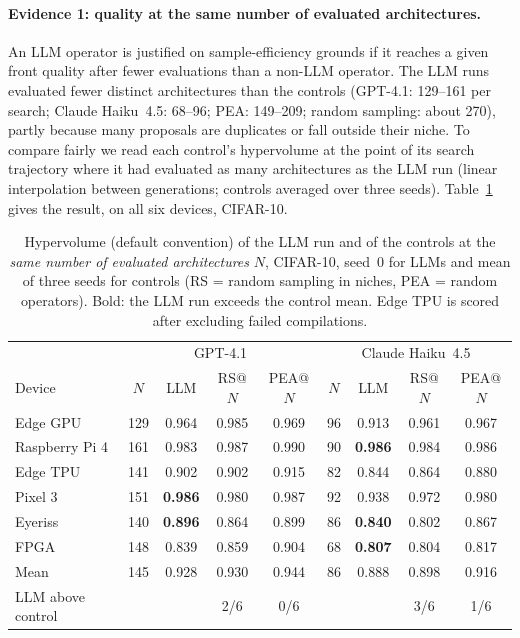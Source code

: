 \documentclass[11pt,a4paper]{article}
\begin{document}
\paragraph{Evidence 1: quality at the same number of evaluated architectures.} An LLM operator is justified on sample-efficiency grounds if it reaches a given front quality after fewer evaluations than a non-LLM operator. The LLM runs evaluated fewer distinct architectures than the controls (GPT-4.1: 129--161 per search; Claude Haiku~4.5: 68--96; PEA: 149--209; random sampling: about 270), partly because many proposals are duplicates or fall outside their niche. To compare fairly we read each control's hypervolume at the point of its search trajectory where it had evaluated as many architectures as the LLM run (linear interpolation between generations; controls averaged over three seeds). Table~\ref{tab:matched} gives the result, on all six devices, CIFAR-10.

\begin{table}[h]\centering\footnotesize
\caption{Hypervolume (default convention) of the LLM run and of the controls at the \emph{same number of evaluated architectures} $N$, CIFAR-10, seed~0 for LLMs and mean of three seeds for controls (RS = random sampling in niches, PEA = random operators). Bold: the LLM run exceeds the control mean. Edge TPU is scored after excluding failed compilations.}\label{tab:matched}
\setlength{\tabcolsep}{4pt}
\begin{tabular}{l|cccc|cccc}
\toprule
 & \multicolumn{4}{c|}{GPT-4.1} & \multicolumn{4}{c}{Claude Haiku~4.5} \\
Device & $N$ & LLM & RS@$N$ & PEA@$N$ & $N$ & LLM & RS@$N$ & PEA@$N$ \\
\midrule
Edge GPU       & 129 & 0.964 & 0.985 & 0.969 & 96 & 0.913 & 0.961 & 0.967 \\
Raspberry Pi 4 & 161 & 0.983 & 0.987 & 0.990 & 90 & \textbf{0.986} & 0.984 & 0.986 \\
Edge TPU       & 141 & 0.902 & 0.902 & 0.915 & 82 & 0.844 & 0.864 & 0.880 \\
Pixel 3        & 151 & \textbf{0.986} & 0.980 & 0.987 & 92 & 0.938 & 0.972 & 0.980 \\
Eyeriss        & 140 & \textbf{0.896} & 0.864 & 0.899 & 86 & \textbf{0.840} & 0.802 & 0.867 \\
FPGA           & 148 & 0.839 & 0.859 & 0.904 & 68 & \textbf{0.807} & 0.804 & 0.817 \\
\midrule
Mean           & 145 & 0.928 & 0.930 & 0.944 & 86 & 0.888 & 0.898 & 0.916 \\
LLM above control & & & 2/6 & 0/6 & & & 3/6 & 1/6 \\
\bottomrule
\end{tabular}
\end{table}
\end{document}
